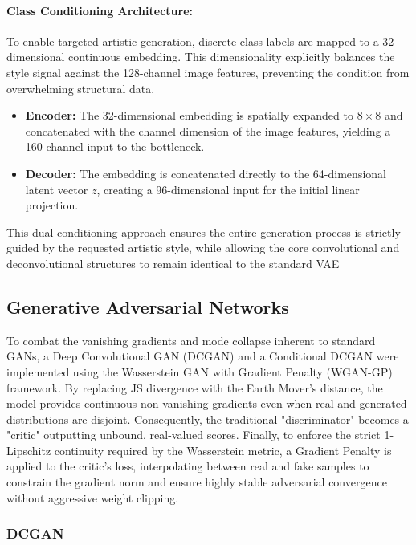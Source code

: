 \documentclass[runningheads]{llncs}
\begin{document}
\paragraph{\normalfont\textbf{Class Conditioning Architecture:}}
To enable targeted artistic generation, discrete class labels are mapped to a 32-dimensional continuous embedding. This dimensionality explicitly balances the style signal against the 128-channel image features, preventing the condition from overwhelming structural data. 
\begin{itemize}
    \item \textbf{Encoder:} The 32-dimensional embedding is spatially expanded to $8 \times 8$ and concatenated with the channel dimension of the image features, yielding a 160-channel input to the bottleneck.
    \item \textbf{Decoder:} The embedding is concatenated directly to the 64-dimensional latent vector $z$, creating a 96-dimensional input for the initial linear projection.
\end{itemize}
\noindent
This dual-conditioning approach ensures the entire generation process is strictly guided by the requested artistic style, while allowing the core convolutional and deconvolutional structures to remain identical to the standard VAE




\subsection{Generative Adversarial Networks}


To combat the vanishing gradients and mode collapse inherent to standard GANs, a Deep Convolutional GAN (DCGAN) and a Conditional DCGAN were implemented using the Wasserstein GAN with Gradient Penalty (WGAN-GP) framework. By replacing JS divergence with the Earth Mover’s distance, the model provides continuous non-vanishing gradients even when real and generated distributions are disjoint. Consequently, the traditional "discriminator" becomes a "critic" outputting unbound, real-valued scores. Finally, to enforce the strict 1-Lipschitz continuity required by the Wasserstein metric, a Gradient Penalty is applied to the critic’s loss, interpolating between real and fake samples to constrain the gradient norm and ensure highly stable adversarial convergence without aggressive weight clipping.
\subsubsection{DCGAN}
\end{document}
